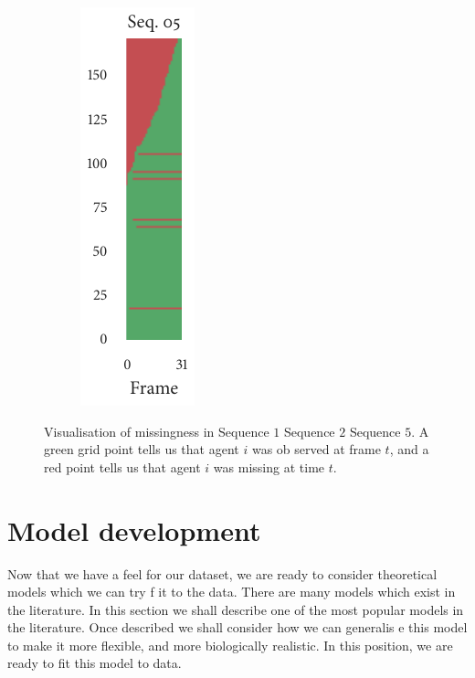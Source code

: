 \begin{figure}[!tbp]
\begin{subfigure}[b]{0.25\textwidth}
		\caption{}
		\label{subfig:missing2}
	\end{subfigure}%
	\hfill
	\begin{subfigure}[b]{0.25\textwidth}
		\hspace{0.35cm}
		\includegraphics{missingness/sequence05.pdf}
		\caption{}
		\label{subfig:missing5}
	\end{subfigure}
	\hfill
	\caption{Visualisation of missingness in  Sequence $1$  Sequence $2$  Sequence $5$. A green grid point tells us that agent $i$ was ob
served at frame $t$, and a red point tells us that agent $i$ was missing at time $t$.}
	\label{fig:missing}
\end{figure}

\section{Model development}
\label{sec:model_development}

Now that we have a feel for our dataset, we are ready to consider theoretical models which we can try f
it to the data. There are many models which exist in the literature. In this section we shall describe 
one of the most popular models in the literature. Once described we shall consider how we can generalis
e this model to make it more flexible, and more biologically realistic. In this position, we are ready 
to fit this model to data.

